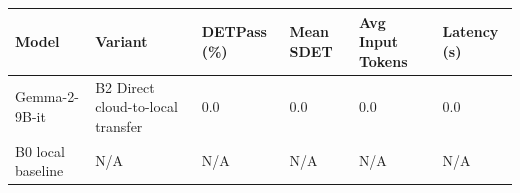 \begin{tabular}{llllll}
\toprule
Model & Variant & DETPass (\%) & Mean SDET & Avg Input Tokens & Latency (s) \\
\midrule
Gemma-2-9B-it & B2 Direct cloud-to-local transfer & 0.0 & 0.0 & 0.0 & 0.0 \\
B0 local baseline & N/A & N/A & N/A & N/A & N/A \\
\bottomrule
\end{tabular}
